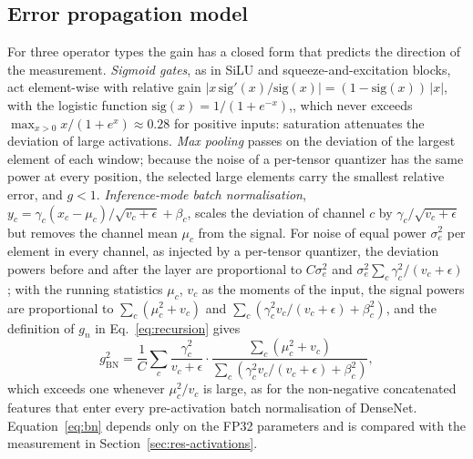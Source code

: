 \documentclass[pdflatex,sn-mathphys-num]{sn-jnl}%
\theoremstyle{thmstyleone}%
\theoremstyle{thmstyletwo}%
\theoremstyle{thmstylethree}%
\begin{document}
\begin{appendices}
\subsection{Error propagation model}\label{sec:supp-prop}
For three operator types the gain has a closed form that predicts the direction of the measurement. \emph{Sigmoid gates}, as in SiLU and squeeze-and-excitation blocks, act element-wise with relative gain $|x\,\mathrm{sig}'(x)/\mathrm{sig}(x)|=(1-\mathrm{sig}(x))\,|x|$, with the logistic function $\mathrm{sig}(x)=1/(1+e^{-x})$,, which never exceeds $\max_{x>0}x/(1+e^{x})\approx0.28$ for positive inputs: saturation attenuates the deviation of large activations. \emph{Max pooling} passes on the deviation of the largest element of each window; because the noise of a per-tensor quantizer has the same power at every position, the selected large elements carry the smallest relative error, and $g<1$. \emph{Inference-mode batch normalisation}, $y_c=\gamma_c(x_c-\mu_c)/\sqrt{v_c+\epsilon}+\beta_c$, scales the deviation of channel $c$ by $\gamma_c/\sqrt{v_c+\epsilon}$ but removes the channel mean $\mu_c$ from the signal. For noise of equal power $\sigma_e^2$ per element in every channel, as injected by a per-tensor quantizer, the deviation powers before and after the layer are proportional to $C\sigma_e^2$ and $\sigma_e^2\sum_c\gamma_c^2/(v_c+\epsilon)$; with the running statistics $\mu_c$, $v_c$ as the moments of the input, the signal powers are proportional to $\sum_c(\mu_c^2+v_c)$ and $\sum_c(\gamma_c^2v_c/(v_c+\epsilon)+\beta_c^2)$, and the definition of $g_n$ in Eq.~\eqref{eq:recursion} gives
\begin{equation}
g_\mathrm{BN}^2=\frac{1}{C}\sum_{c}\frac{\gamma_c^2}{v_c+\epsilon}\cdot\frac{\sum_c\left(\mu_c^2+v_c\right)}{\sum_c\left(\gamma_c^2v_c/(v_c+\epsilon)+\beta_c^2\right)},\label{eq:bn}
\end{equation}
which exceeds one whenever $\mu_c^2/v_c$ is large, as for the non-negative concatenated features that enter every pre-activation batch normalisation of DenseNet. Equation~\eqref{eq:bn} depends only on the FP32 parameters and is compared with the measurement in Section~\ref{sec:res-activations}.


\end{appendices}
\end{document}
